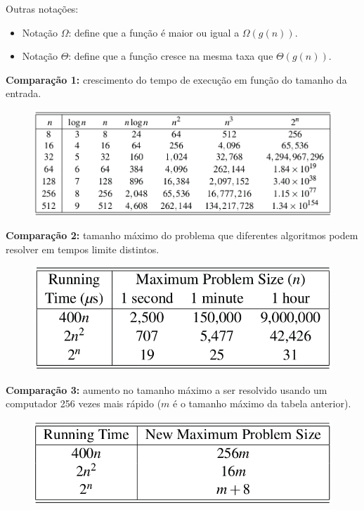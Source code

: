 \clearpage

Outras notações:
\begin{itemize}
	\item Notação $\Omega$: define que a função é maior ou igual a $\Omega(g(n))$.
	\item Notação $\Theta$: define que a função cresce na mesma taxa que $\Theta(g(n))$.
\end{itemize}

\medskip


\textbf{Comparação 1:} crescimento do tempo de execução em função do tamanho da entrada.

\begin{figure}[H]
	\centering
	\includegraphics[width=0.7\linewidth]{img/comparacao-complexidade}
\end{figure}

\textbf{Comparação 2:} tamanho máximo do problema que diferentes algoritmos podem resolver em tempos limite distintos.

\begin{figure}[H]
	\centering
	\includegraphics[width=0.4\linewidth]{img/comparacao-tamanhos}
\end{figure}

\textbf{Comparação 3:} aumento no tamanho máximo a ser resolvido usando um computador 256 vezes mais rápido ($m$ é o tamanho máximo da tabela anterior).

\begin{figure}[H]
	\centering
	\includegraphics[width=0.4\linewidth]{img/comparacao-speedup}
\end{figure}

\clearpage

